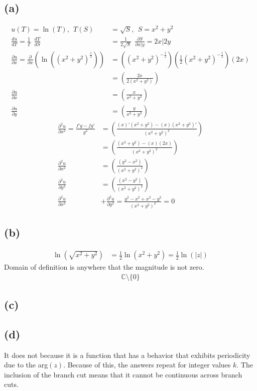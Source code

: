 \documentclass{article}
\newcommand{\der}[2]{\frac{d#1}{d#2}}
\newcommand{\parder}[2]{\frac{\partial#1}{\partial#2}}
\newcommand{\secparder}[2]{\frac{\partial^2#1}{\partial#2^2}}
\begin{document}
\subsection*{(a)}
\begin{align*}
  u(T) = \ln(T),\ \ T(S) &= \sqrt{S}, \ \ S = x^2+y^2 \\ 
  \der{u}{T} = \frac{1}{T} \ \ \der{T}{S} &= \frac{1}{2\sqrt{S}}\ \ \parder{S}{x|y} = 2x|2y\\
  \parder{u}{x} = \parder{}{x}(\ln{((x^2+y^2)^{\frac{1}{2}})}) &= ((x^2+y^2)^{-\frac{1}{2}})\left(\frac{1}{2}(x^2+y^2)^{-\frac{1}{2}}\right)(2x) \\
  &=\left(\frac{2x}{2(x^2+y^2)}\right)\\
  \parder{u}{x} &=\left(\frac{x}{x^2+y^2}\right)\\
  \parder{u}{y} &= \left(\frac{y}{x^2+y^2}\right)
\end{align*}
\begin{align*}
  \secparder{u}{x} =\frac{f'g-fg'}{g^2} &= \left(\frac{(x)'(x^2+y^2)-(x)(x^2+y^2)'}{(x^2+y^2)^2}\right)\\
                                        &= \left(\frac{(x^2+y^2)-(x)(2x)}{(x^2+y^2)^2}\right)\\
  \secparder{u}{x} &= \left(\frac{(y^2-x^2)}{(x^2+y^2)^2}\right)\\
  \secparder{u}{y}&= \left(\frac{(x^2-y^2)}{(x^2+y^2)^2}\right)\\
  \secparder{u}{x} &+ \secparder{u}{y} =  \frac{y^2-x^2 + x^2-y^2}{(x^2+y^2)^2} = 0
\end{align*}
\subsection*{(b)}
\begin{align*}
  \ln{(\sqrt{x^2+y^2})} &= \frac{1}{2}\ln{(x^2+y^2)} = \frac{1}{2}\ln{(|z|)}
\end{align*}
Domain of definition is anywhere that the magnitude is not zero.
\begin{align*}
  \mathbb{C}\setminus \{0\}
\end{align*}
\subsection*{(c)}
\subsection*{(d)}
It does not because it is a function that has a behavior that exhibits periodicity due to the arg$(z)$. Because of this, the answers repeat for integer values $k$. The inclusion of the branch cut means that it cannot be continuous across branch cuts.
\newpage
\end{document}
